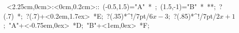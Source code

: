 \hbox{
\xy    <2.25cm,0cm>:<0cm,0.2cm>::
       (-0.5,1.5)="A" *{\bullet}  ; (1.5,-1)="B" *{\bullet}  **\dir{-};
       ?(.7) *{\bullet}; ?(.7)+<0.2em,1.7ex> *{E};
       ?(.35)*^!/7pt/\hbox{$6x-3$};
       ?(.85)*^!/7pt/\hbox{$2x+1$};
       "A"+<-0.75em,0ex> *{D};
       "B"+<1em,0ex> *{F};
       \endxy}

